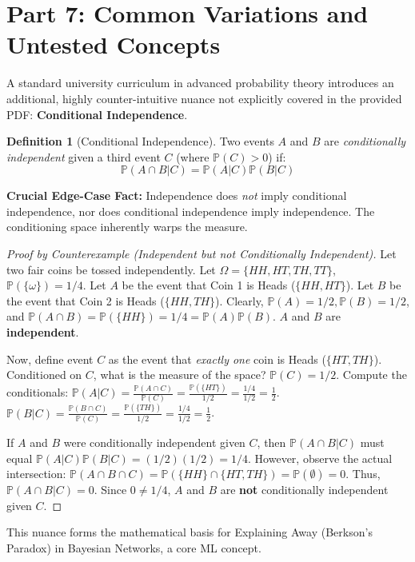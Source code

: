 \documentclass[12pt, a4paper]{article}
\theoremstyle{definition}
\newtheorem{definition}{Definition}[section]
\theoremstyle{remark}
\newcommand{\Prob}{\mathbb{P}}
\newcommand{\W}{\Omega}
\newcommand{\1}{\mathbf{1}}
\begin{document}
\newpage

\section{Part 7: Common Variations and Untested Concepts}

A standard university curriculum in advanced probability theory introduces an additional, highly counter-intuitive nuance not explicitly covered in the provided PDF: \textbf{Conditional Independence}.

\begin{definition}[Conditional Independence]
Two events $A$ and $B$ are \textit{conditionally independent} given a third event $C$ (where $\Prob(C) > 0$) if:
\[ \Prob(A \cap B | C) = \Prob(A | C)\Prob(B | C) \]
\end{definition}

\textbf{Crucial Edge-Case Fact:} Independence does \textit{not} imply conditional independence, nor does conditional independence imply independence. The conditioning space inherently warps the measure.

\begin{proof}[Proof by Counterexample (Independent but not Conditionally Independent)]
Let two fair coins be tossed independently. Let $\W = \{HH, HT, TH, TT\}$, $\Prob(\{\omega\}) = 1/4$.
Let $A$ be the event that Coin 1 is Heads ($\{HH, HT\}$).
Let $B$ be the event that Coin 2 is Heads ($\{HH, TH\}$).
Clearly, $\Prob(A) = 1/2, \Prob(B) = 1/2$, and $\Prob(A \cap B) = \Prob(\{HH\}) = 1/4 = \Prob(A)\Prob(B)$. $A$ and $B$ are \textbf{independent}.

Now, define event $C$ as the event that \textit{exactly one} coin is Heads ($\{HT, TH\}$).
Conditioned on $C$, what is the measure of the space? $\Prob(C) = 1/2$.
Compute the conditionals:
$\Prob(A|C) = \frac{\Prob(A \cap C)}{\Prob(C)} = \frac{\Prob(\{HT\})}{1/2} = \frac{1/4}{1/2} = \frac{1}{2}$.
$\Prob(B|C) = \frac{\Prob(B \cap C)}{\Prob(C)} = \frac{\Prob(\{TH\})}{1/2} = \frac{1/4}{1/2} = \frac{1}{2}$.

If $A$ and $B$ were conditionally independent given $C$, then $\Prob(A \cap B | C)$ must equal $\Prob(A|C)\Prob(B|C) = (1/2)(1/2) = 1/4$.
However, observe the actual intersection: $\Prob(A \cap B \cap C) = \Prob(\{HH\} \cap \{HT, TH\}) = \Prob(\emptyset) = 0$.
Thus, $\Prob(A \cap B | C) = 0$. 
Since $0 \neq 1/4$, $A$ and $B$ are \textbf{not} conditionally independent given $C$.
\end{proof}
This nuance forms the mathematical basis for Explaining Away (Berkson's Paradox) in Bayesian Networks, a core ML concept.
\end{document}
